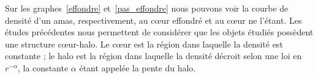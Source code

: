 
	Sur les graphes~\ref{effondre} et~\ref{pas_effondre} nous pouvons voir la courbe de densité
	d'un amas, respectivement, au cœur effondré et au cœur ne l'étant.
	Les études précédentes nous permettent de considérer que les objets étudiés possèdent une structure cœur-halo. Le cœur est la région dans laquelle la densité est constante ; le halo est la région dans laquelle la densité
	décroit selon une loi en $r^{-\alpha}$, la constante $\alpha$ étant appelée la pente du halo.

